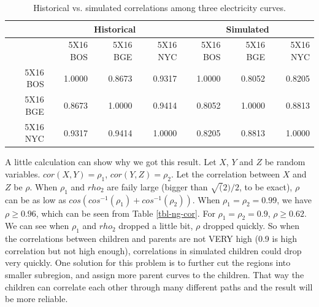 \begin{table}[htbp]
\begin{center}
\caption{Historical vs. simulated correlations among three electricity curves.}
\begin{tabular}{rrrr|rrr}
\hline
 &  \multicolumn{3}{c|}{Historical} &  \multicolumn{3}{|c}{Simulated} \\ \hline
 &  5X16 BOS  &  5X16 BGE  &  5X16 NYC  &  5X16 BOS  &  5X16 BGE  &  5X16 NYC  \\
  \hline
 5X16 BOS  & 1.0000 & 0.8673 & 0.9317 & 1.0000 & 0.8052 & 0.8205 \\
   5X16 BGE  & 0.8673 & 1.0000 & 0.9414 & 0.8052 & 1.0000 & 0.8813 \\
   5X16 NYC  & 0.9317 & 0.9414 & 1.0000 & 0.8205 & 0.8813 & 1.0000 \\
   \hline
\end{tabular}
\end{center}
\label{tbl-elec-cor}
\end{table}

A little  calculation can show why we got this result.
Let $X$, $Y$ and $Z$
be random variables. $cor(X,Y)=\rho_1$, $cor(Y,Z)=\rho_2$. 
Let the correlation between $X$ and $Z$ be $\rho$. 
When $\rho_1$ and $rho_2$ are faily large (bigger than
$\sqrt(2)/2$, to be exact), $\rho$ can be as low as 
$cos(cos^{-1}(\rho_1)+cos^{-1}(\rho_2))$. When $\rho_1=\rho_2=0.99$, 
we have $\rho \ge 0.96$, which can be seen from Table 
\ref{tbl-ng-cor}. For $\rho_1=\rho_2=0.9$, $\rho \ge 0.62$.
We can see when $\rho_1$ and $rho_2$ dropped a little bit,
$\rho$ dropped quickly. 
So when the correlations between children and parents are
not VERY high (0.9 is high correlation but not high enough),
correlations in simulated children could drop very quickly. 
One solution for this problem is to further cut the regions into
smaller subregion, and assign more parent curves to the children.
That way the children can correlate each other through 
many different paths and the result will be more reliable.
